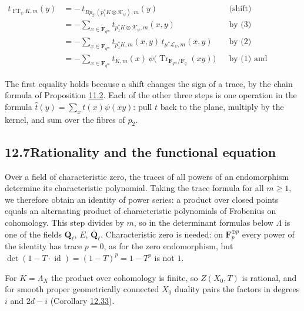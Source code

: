 \documentclass[11pt]{article}
\begin{document}
\[
\begin{aligned}
t_{\operatorname{FT}_\psi K,m}(y)
&=-\,t_{Rp_{2!}(p_1^*K\otimes\mathcal K_\psi),m}(y)
&&\text{(shift)}\\
&=-\sum_{x\in\mathbf F_{q^m}}t_{p_1^*K\otimes\mathcal K_\psi,m}(x,y)
&&\text{by (3)}\\
&=-\sum_{x\in\mathbf F_{q^m}}t_{p_1^*K,m}(x,y)\,t_{\mu^*\mathcal L_\psi,m}(x,y)
&&\text{by (2)}\\
&=-\sum_{x\in\mathbf F_{q^m}}t_{K,m}(x)\,
\psi\bigl(\operatorname{Tr}_{\mathbf F_{q^m}/\mathbf F_q}(xy)\bigr)
&&\text{by (1) and Lemma~16.1.1.}
\end{aligned}
\]

The first equality holds because a shift changes the sign of a trace, by the chain formula of Proposition \hyperref[bp176]{11.2}. Each of the other three steps is one operation in the formula \(\hat t(y)=\sum_xt(x)\psi(xy)\): pull \(t\) back to the plane, multiply by the kernel, and sum over the fibres of \(p_2\).


\subsection*{\texorpdfstring{12.7\quad Rationality and the functional equation}{12.7 Rationality and the functional equation}}
\label{bp312}%
\label{bp313}%
Over a field of characteristic zero, the traces of all powers of an endomorphism determine its characteristic polynomial. Taking the trace formula for all \(m\geq1\), we therefore obtain an identity of power series: a product over closed points equals an alternating product of characteristic polynomials of Frobenius on cohomology. This step divides by \(m\), so in the determinant formulas below \(\Lambda\) is one of the fields \(\mathbf Q_\ell\), \(E\), \(\overline{\mathbf Q}_\ell\). Characteristic zero is needed: on \(\mathbf F_p^{\oplus p}\) every power of the identity has trace \(p=0\), as for the zero endomorphism, but \(\det(1-T\cdot\operatorname{id})=(1-T)^p=1-T^p\) is not \(1\).

For \(K=\Lambda_X\) the product over cohomology is finite, so \(Z(X_0,T)\) is rational, and for smooth proper geometrically connected \(X_0\) duality pairs the factors in degrees \(i\) and \(2d-i\) (Corollary \hyperref[bp325]{12.33}).
\end{document}

